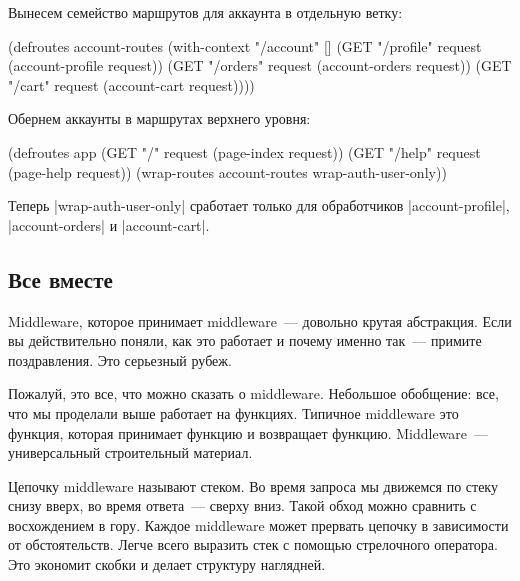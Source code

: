 Вынесем семейство маршрутов для аккаунта в отдельную ветку:

\begin{code}
(defroutes account-routes
  (with-context "/account" []
    (GET "/profile" request (account-profile request))
    (GET "/orders" request (account-orders request))
    (GET "/cart" request (account-cart request))))
\end{code}

Обернем аккаунты в маршрутах верхнего уровня:

\begin{code}
(defroutes app
  (GET "/" request (page-index request))
  (GET "/help" request (page-help request))
  (wrap-routes account-routes wrap-auth-user-only))
\end{code}

Теперь \spverb|wrap-auth-user-only| сработает только для обработчиков
\spverb|account-profile|, \spverb|account-orders| и \spverb|account-cart|.

\subsection{Все вместе}

Middleware, которое принимает middleware~--- довольно крутая абстракция. Если вы
действительно поняли, как это работает и почему именно так~--- примите
поздравления. Это серьезный рубеж.

Пожалуй, это все, что можно сказать о middleware. Небольшое обобщение: все, что
мы проделали выше работает на функциях. Типичное middleware это функция, которая
принимает функцию и возвращает функцию. Middleware~--- универсальный строительный
материал.

Цепочку middleware называют стеком. Во время запроса мы движемся по стеку снизу
вверх, во время ответа~--- сверху вниз. Такой обход можно сравнить с восхождением
в гору. Каждое middleware может прервать цепочку в зависимости от
обстоятельств. Легче всего выразить стек с помощью стрелочного оператора. Это
экономит скобки и делает структуру наглядней.
